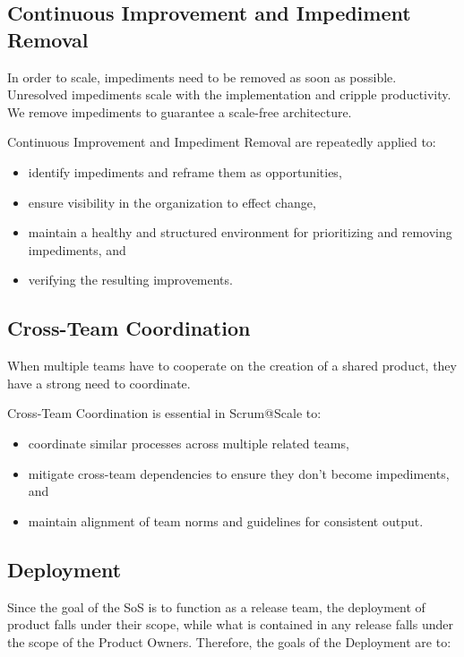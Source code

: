\documentclass[12pt,a4paper,parskip=full]{scrartcl}
\begin{document}
\subsection{Continuous Improvement and Impediment Removal}

In order to scale, impediments need to be removed as soon as possible.
Unresolved impediments scale with the implementation and cripple productivity.
We remove impediments to guarantee a scale-free architecture.

Continuous Improvement and Impediment Removal are repeatedly applied to:

\begin{itemize}
	\item identify impediments and reframe them as opportunities,
	\item ensure visibility in the organization to effect change,
	\item maintain a healthy and structured environment for prioritizing and removing impediments, and 
	\item verifying the resulting improvements.
\end{itemize}

\subsection{Cross-Team Coordination}

When multiple teams have to cooperate on the creation of a shared product,
they have a strong need to coordinate.

Cross-Team Coordination is essential in Scrum@Scale to:

\begin{itemize}
	\item coordinate similar processes across multiple related teams,
	\item mitigate cross-team dependencies to ensure they don't become impediments, and 
	\item maintain alignment of team norms and guidelines for consistent output.
\end{itemize}

\subsection{Deployment}

Since the goal of the SoS is to function as a release team, the deployment of product falls under their scope, while what is contained in any release falls under the scope of the Product Owners. Therefore, the goals of the Deployment are to:
\end{document}
